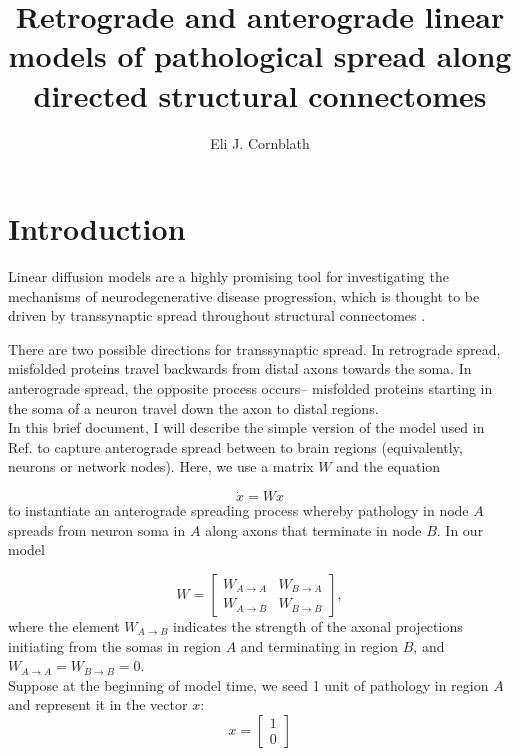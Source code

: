 \documentclass{article}
\title{Retrograde and anterograde linear models of pathological spread along directed structural connectomes}
\author{Eli J. Cornblath}
\begin{document}
	
\maketitle

\section*{Introduction}

Linear diffusion models are a highly promising tool for investigating the mechanisms of neurodegenerative disease progression, which is thought to be driven by transsynaptic spread throughout structural connectomes \cite{Raj2012,Pandya2017,Pandya2019,Henderson2019,Mezias2020}.

There are two possible directions for transsynaptic spread. In retrograde spread, misfolded proteins travel backwards from distal axons towards the soma. In anterograde spread, the opposite process occurs-- misfolded proteins starting in the soma of a neuron travel down the axon to distal regions.\\

In this brief document, I will describe the simple version of the model used in Ref. \cite{Henderson2019} to capture anterograde spread between to brain regions (equivalently, neurons or network nodes). Here, we use a matrix $W$ and the equation 

\begin{equation}
\dot{x}=Wx
\label{eq1}
\end{equation}
to instantiate an anterograde spreading process whereby pathology in node $A$ spreads from neuron soma in $A$ along axons that terminate in node $B$. In our model

\begin{equation}
W= 
\begin{bmatrix}
W_{A\rightarrow A} & W_{B\rightarrow A}\\
W_{A\rightarrow B} & 	W_{B\rightarrow B}
\end{bmatrix},
\label{eq2}
\end{equation}
where the element $W_{A\rightarrow B}$ indicates the strength of the axonal projections initiating from the somas in region $A$ and terminating in region $B$, and $	W_{A\rightarrow A} = 	W_{B\rightarrow B} = 0$. \\

Suppose at the beginning of model time, we seed 1 unit of pathology in region $A$ and represent it in the vector $x$:
\begin{equation}
x = \begin{bmatrix}
1 \\ 0
\end{bmatrix}
\label{eq3}
\end{equation}
\end{document}
